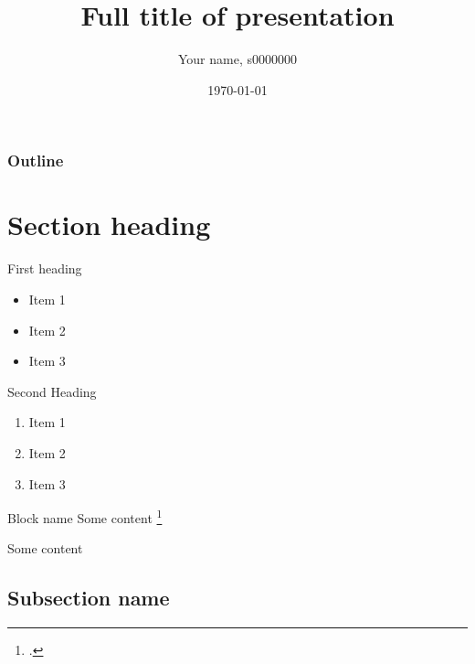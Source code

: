 \documentclass{beamer}
\title[Short title]{Full title of presentation}
\author{Your name, s0000000}
\institute{The University of Edinburgh}
\date{\today}
\begin{document}
\begin{frame}
  \titlepage
\end{frame}


\begin{frame}
\frametitle{Outline}
\tableofcontents
\end{frame}


\section{Section heading}

\begin{frame}{First heading}

\begin{itemize}
  \item Item 1\pause
  \item Item 2\pause
  \item Item 3\pause
\end{itemize}

\end{frame}


\begin{frame}{Second Heading}

\begin{enumerate}
\item Item 1
\item Item 2
\item Item 3
\end{enumerate}

\begin{block}{Block name}
Some content \footcite{bickerton_2021_honours} %
\end{block}

\begin{example}
Some content
\end{example}

\end{frame}


\subsection{Subsection name}
\end{document}
